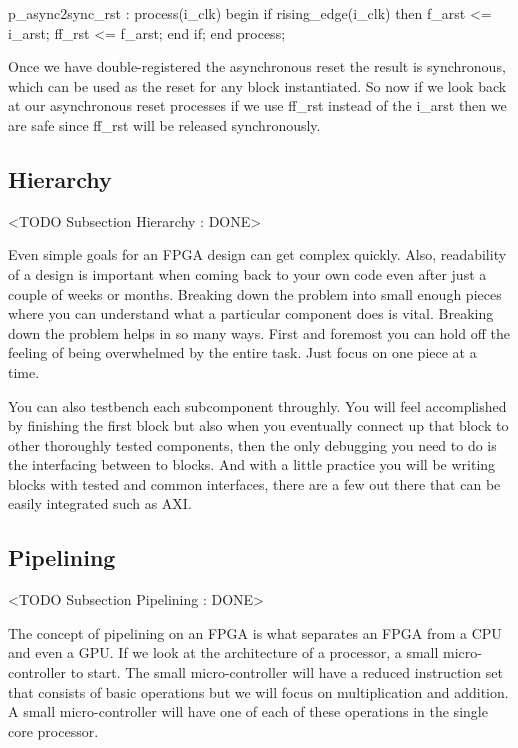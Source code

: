 \begin{VHDLlisting}[tabsize=4]
p_async2sync_rst : process(i_clk)
begin
	if rising_edge(i_clk) then
		f_arst <= i_arst;
		ff_rst <= f_arst;
	end if;
end process;
\end{VHDLlisting}
		
Once we have double-registered the asynchronous reset the result is synchronous, which can be used as the reset for any block instantiated. So now if we look back at our asynchronous reset processes if we use ff\_rst instead of the i\_arst then we are safe since ff\_rst will be released synchronously. 
		
\subsection{Hierarchy} 
	<TODO Subsection Hierarchy : DONE>

Even simple goals for an \ac{FPGA} design can get complex quickly. Also, readability of a design is important when coming back to your own code even after just a couple of weeks or months. Breaking down the problem into small enough pieces where you can understand what a particular component does is vital. Breaking down the problem helps in so many ways. First and foremost you can hold off the feeling of being overwhelmed by the entire task. Just focus on one piece at a time. 

You can also testbench each subcomponent throughly. You will feel accomplished by finishing the first block but also when you eventually connect up that block to other thoroughly tested components, then the only debugging you need to do is the interfacing between to blocks. And with a little practice you will be writing blocks with tested and common interfaces, there are a few out there that can be easily integrated such as \ac{AXI}. 
	
\subsection{Pipelining}
	<TODO Subsection Pipelining : DONE>
	
The concept of pipelining on an \ac{FPGA} is what separates an \ac{FPGA} from a \ac{CPU} and even a \ac{GPU}. If we look at the architecture of a processor, a small micro-controller to start. The small micro-controller will have a reduced instruction set that consists of basic operations but we will focus on multiplication and addition. A small micro-controller will have one of each of these operations in the single core processor.

